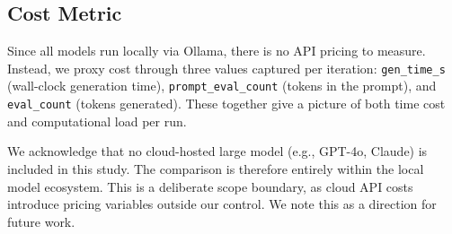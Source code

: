\subsection{Cost Metric}





Since all models run locally via Ollama, there is no API pricing to measure. Instead, we proxy cost through three values captured per iteration: \verb|gen_time_s| (wall-clock generation time), \verb|prompt_eval_count| (tokens in the prompt), and \verb|eval_count| (tokens generated). These together give a picture of both time cost and computational load per run.




We acknowledge that no cloud-hosted large model (e.g., GPT-4o, Claude) is included in this study. The comparison is therefore entirely within the local model ecosystem. This is a deliberate scope boundary, as cloud API costs introduce pricing variables outside our control. We note this as a direction for future work.
